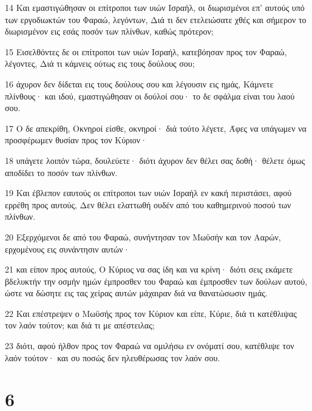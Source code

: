 \par 14 Και εμαστιγώθησαν οι επίτροποι των υιών Ισραήλ, οι διωρισμένοι επ' αυτούς υπό των εργοδιωκτών του Φαραώ, λεγόντων, Διά τι δεν ετελειώσατε χθές και σήμερον το διωρισμένον εις εσάς ποσόν των πλίνθων, καθώς πρότερον;
\par 15 Εισελθόντες δε οι επίτροποι των υιών Ισραήλ, κατεβόησαν προς τον Φαραώ, λέγοντες, Διά τι κάμνεις ούτως εις τους δούλους σου;
\par 16 άχυρον δεν δίδεται εις τους δούλους σου και λέγουσιν εις ημάς, Κάμνετε πλίνθους· και ιδού, εμαστιγώθησαν οι δούλοί σου· το δε σφάλμα είναι του λαού σου.
\par 17 Ο δε απεκρίθη, Οκνηροί είσθε, οκνηροί· διά τούτο λέγετε, Άφες να υπάγωμεν να προσφέρωμεν θυσίαν προς τον Κύριον·
\par 18 υπάγετε λοιπόν τώρα, δουλεύετε· διότι άχυρον δεν θέλει σας δοθή· θέλετε όμως αποδίδει το ποσόν των πλίνθων.
\par 19 Και έβλεπον εαυτούς οι επίτροποι των υιών Ισραήλ εν κακή περιστάσει, αφού ερρέθη προς αυτούς, Δεν θέλει ελαττωθή ουδέν από του καθημερινού ποσού των πλίνθων.
\par 20 Εξερχόμενοι δε από του Φαραώ, συνήντησαν τον Μωϋσήν και τον Ααρών, ερχομένους εις συνάντησιν αυτών·
\par 21 και είπον προς αυτούς, Ο Κύριος να σας ίδη και να κρίνη· διότι σεις εκάμετε βδελυκτήν την οσμήν ημών έμπροσθεν του Φαραώ και έμπροσθεν των δούλων αυτού, ώστε να δώσητε εις τας χείρας αυτών μάχαιραν διά να θανατώσωσιν ημάς.
\par 22 Και επέστρεψεν ο Μωϋσής προς τον Κύριον και είπε, Κύριε, διά τι κατέθλιψας τον λαόν τούτον; και διά τι με απέστειλας;
\par 23 διότι, αφού ήλθον προς τον Φαραώ να ομιλήσω εν ονόματί σου, κατέθλιψε τον λαόν τούτον· και συ ποσώς δεν ηλευθέρωσας τον λαόν σου.

\chapter{6}

